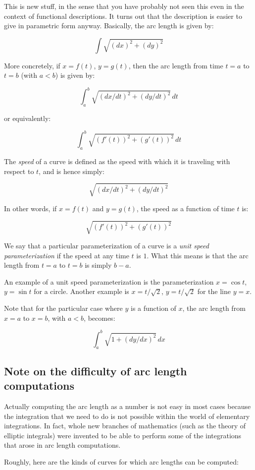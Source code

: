 \documentclass[10pt]{amsart}
\begin{document}
This is new stuff, in the sense that you have probably not seen this
even in the context of functional descriptions. It turns out that the
description is easier to give in parametric form anyway. Basically,
the arc length is given by:

$$\int \sqrt{(dx)^2 + (dy)^2}$$

More concretely, if $x = f(t)$, $y = g(t)$, then the arc length from time $t = a$ to $t = b$ (with $a < b$) is given by:

$$\int_a^b \sqrt{(dx/dt)^2 + (dy/dt)^2} \, dt$$

or equivalently:

$$\int_a^b \sqrt{(f'(t))^2 + (g'(t))^2} \, dt$$

The {\em speed} of a curve is defined as the speed with which it is
traveling with respect to $t$, and is hence simply:

$$\sqrt{(dx/dt)^2 + (dy/dt)^2}$$

In other words, if $x = f(t)$ and $y = g(t)$, the speed as a function
of time $t$ is:

$$\sqrt{(f'(t))^2 + (g'(t))^2}$$

We say that a particular parameterization of a curve is a {\em unit
speed parameterization} if the speed at any time $t$ is $1$. What this
means is that the arc length from $t = a$ to $t = b$ is simply $b -
a$. 

An example of a unit speed parameterization is the parameterization $x
= \cos t$, $y = \sin t$ for a circle. Another example is $x =
t/\sqrt{2}$, $y = t/\sqrt{2}$ for the line $y = x$.

Note that for the particular case where $y$ is a function of $x$, the
arc length from $x = a$ to $x = b$, with $a < b$, becomes:

$$\int_a^b \sqrt{1 + (dy/dx)^2} \, dx$$

\subsection*{Note on the difficulty of arc length computations}

Actually computing the arc length as a number is not easy in most
cases because the integration that we need to do is not possible
within the world of elementary integrations. In fact, whole new
branches of mathematics (such as the theory of elliptic integrals)
were invented to be able to perform some of the integrations that
arose in arc length computations.

Roughly, here are the kinds of curves for which arc lengths can be
computed:
\end{document}
